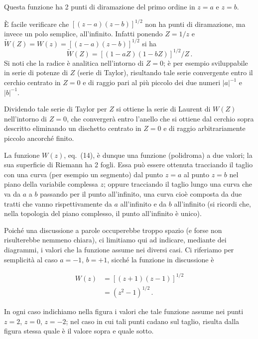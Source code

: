 \documentclass[11pt, a4paper]{book}
\numberwithin{equation}{section}
\begin{document}
Questa funzione ha 2 punti di diramazione del primo ordine in $z=a$ e $z=b$.

\medskip
\noindent
È facile verificare che $\left[(z-a)(z-b)\right]^{1/2}$ non ha punti
di diramazione, ma invece un polo semplice, all'infinito. Infatti ponendo
$Z = 1/z$ e $\tilde{W}(Z) = W(z) = \left[(z-a)(z-b)\right]^{1/2}$
si ha
\[
    \tilde{W}(Z) = \left[(1-aZ)(1-bZ)\right]^{1/2} / Z \,.
\]
Si noti che la radice è analitica nell'intorno di $Z=0$; è per esempio sviluppabile
in serie di potenze di $Z$ (serie di Taylor), risultando tale serie convergente
entro il cerchio centrato in $Z=0$ e di raggio pari al più piccolo dei due
numeri $|a|^{-1}$ e $|b|^{-1}$.

Dividendo tale serie di Taylor per $Z$ si ottiene la serie di Laurent di
$W(Z)$ nell'intorno di $Z=0$, che convergerà entro l'anello che si ottiene dal
cerchio sopra descritto eliminando un dischetto centrato in $Z=0$ e di raggio
arbitrariamente piccolo ancorché finito.

\medskip
\noindent
La funzione $W(z)$, eq.~(14), è dunque una funzione (polidroma) a due
valori; la sua superficie di Riemann ha 2 fogli. Essa può essere ottenuta
tracciando il taglio con una curva (per esempio un segmento) dal punto
$z=a$ al punto $z=b$ nel piano della variabile complessa $z$; oppure tracciando
il taglio lungo una curva che va da $a$ a $b$ passando per il punto all'infinito,
una curva cioè composta da due tratti che vanno rispettivamente da $a$ all'infinito
e da $b$ all'infinito (si ricordi che, nella topologia del piano complesso,
il punto all'infinito è unico).

Poiché una discussione a parole occuperebbe troppo spazio (e forse
non risulterebbe nemmeno chiara), ci limitiamo qui ad indicare, mediante
dei diagrammi, i valori che la funzione assume nei diversi casi. Ci riferiamo
per semplicità al caso $a=-1$, $b=+1$, sicché la funzione in discussione
è


\begin{align}
    W(z) &= \left[(z+1)(z-1)\right]^{1/2} \tag{15a}\\
         &= \left(z^2-1\right)^{1/2} \,. \tag{15b}
\end{align}

In ogni caso indichiamo nella figura i valori che tale funzione assume nei
punti $z=2$, $z=0$, $z=-2$; nel caso in cui tali punti cadano sul taglio, risulta
dalla figura stessa quale è il valore sopra e quale sotto.
\end{document}
